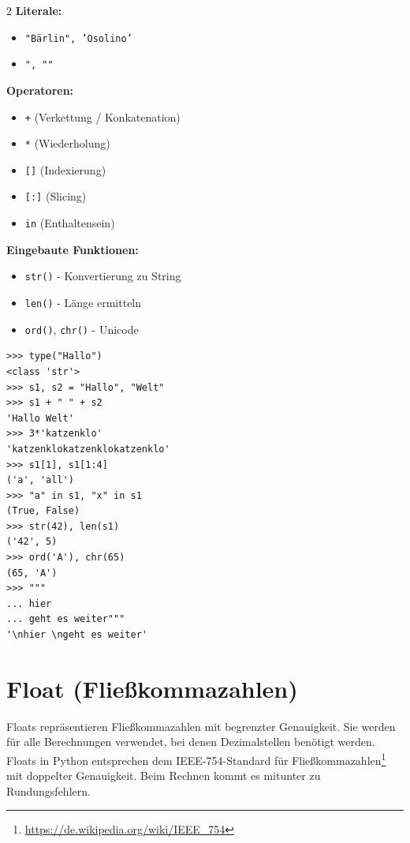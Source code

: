 \documentclass[ngerman,11pt]{article}
\begin{document}
\begin{multicols}{2}\raggedcolumns
\noindent\textbf{Literale:}
\begin{itemize}[leftmargin=*]
    \item \texttt{"Bärlin", 'Osolino'}  
    \item \texttt{", ""} 
\end{itemize}
\par\bigskip

\noindent\textbf{Operatoren:}
\begin{itemize}[leftmargin=*]
    \item \texttt{+} (Verkettung / Konkatenation)
    \item \texttt{*} (Wiederholung)
    \item \texttt{[]} (Indexierung)
    \item \texttt{[:]} (Slicing)
    \item \texttt{in} (Enthaltensein)
\end{itemize}
\par\bigskip

\noindent\textbf{Eingebaute Funktionen:}
\begin{itemize}[leftmargin=*]
    \item \texttt{str()} - Konvertierung zu String
    \item \texttt{len()} - Länge ermitteln
    \item \texttt{ord()}, \texttt{chr()} - Unicode 
\end{itemize}
\columnbreak

\begin{lstlisting}
>>> type("Hallo")
<class 'str'>
>>> s1, s2 = "Hallo", "Welt"
>>> s1 + " " + s2
'Hallo Welt'
>>> 3*'katzenklo'
'katzenklokatzenklokatzenklo'
>>> s1[1], s1[1:4]
('a', 'all')
>>> "a" in s1, "x" in s1
(True, False)
>>> str(42), len(s1)
('42', 5)
>>> ord('A'), chr(65)
(65, 'A')
>>> """
... hier 
... geht es weiter"""
'\nhier \ngeht es weiter'
\end{lstlisting}
\end{multicols}
\pagebreak
\section{Float (Fließkommazahlen)}

Floats repräsentieren Fließkommazahlen mit begrenzter Genauigkeit. Sie werden für alle Berechnungen verwendet, bei denen Dezimalstellen benötigt werden. Floats in Python entsprechen dem IEEE-754-Standard für Fließkommazahlen\footnote{\url{https://de.wikipedia.org/wiki/IEEE_754}} mit doppelter Genauigkeit. Beim Rechnen kommt es mitunter zu Rundungsfehlern.
\end{document}
